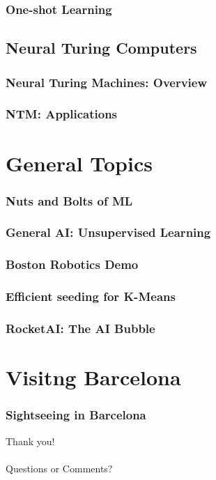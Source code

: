 \documentclass[11pt,
               hyperref={colorlinks,citecolor=pink,linkcolor=red,urlcolor=blue}
               ]{beamer}
\begin{document}
  \begin{frame}
    \frametitle{One-shot Learning}

  \end{frame}

  \subsection{Neural Turing Computers}

  \begin{frame}
    \frametitle{Neural Turing Machines: Overview}

  \end{frame}

  \begin{frame}
    \frametitle{NTM: Applications}

  \end{frame}

  \section{General Topics}

  \begin{frame}
    \frametitle{Nuts and Bolts of ML}

  \end{frame}

  \begin{frame}
    \frametitle{General AI: Unsupervised Learning}

  \end{frame}

  \begin{frame}
    \frametitle{Boston Robotics Demo}

  \end{frame}

  \begin{frame}
    \frametitle{Efficient seeding for K-Means}

  \end{frame}

  \begin{frame}
    \frametitle{RocketAI: The AI Bubble}

  \end{frame}

  \section{Visitng Barcelona}

  \begin{frame}
    \frametitle{Sightseeing in Barcelona}

  \end{frame}

  \begin{frame}[noframenumbering]

    \begin{center}
      \Huge{Thank you!}\\~\\
      \huge{Questions or Comments?}
    \end{center}
  \end{frame}
\end{document}
